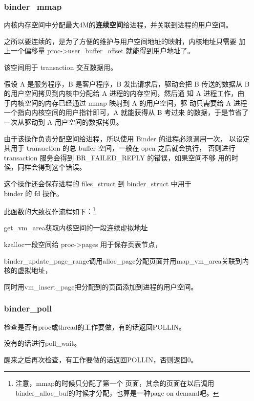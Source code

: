 \documentclass[a4paper,11pt]{article}
\begin{document}
\subsubsection{binder_mmap}\label{Bindermmap}
内核内存空间中分配最大4M的\textbf{\color{red}连续空间}给进程，并关联到进程的用户空间。
\begin{itemize*}
    \item 之所以要连续的，是为了方便的维护与用户空间地址的映射，内核地址只需要
        加上一个偏移量 proc->user_buffer_offset 就能得到用户地址了。
    \item 该空间用于 transaction 交互数据用。

        {\footnotesize 假设 A 是服务程序，B 是客户程序，B 发出请求后，驱动会把
        B 传送的数据从 B 的用户空间拷贝到内核中分配给 A 进程的内存空间，然后通
        知 A 进程工作，由于内核空间的内存已经通过 mmap 映射到 A 的用户空间，驱
        动只需要给 A 进程一个指向内核空间的用户指针即可，A 就能获得从 B 考过来
        的数据，于是节省了一次从驱动到 A 用户空间的数据拷贝。}
    \item 由于该操作负责分配空间给进程，所以使用 Binder 的进程必须调用一次，
        以设定其用于 transaction 的总 buffer 空间，一般在 open 之后就会执行，
        否则进行 transaction 服务会得到 BR_FAILED_REPLY 的错误，如果空间不够
        用的时候，同样会得到这个错误。
    \item 这个操作还会保存进程的 files_struct 到 binder_struct 中用于\\ binder
        的 fd 操作。
\end{itemize*}
此函数的大致操作流程如下：\footnote{\color{blue}注意，mmap的时候只分配了第一个
页面，其余的页面在以后调用binder_alloc_buf的时候才分配，也算是一种page on
demand吧。}
\begin{itemize*}
    \item get_vm_area获取内核空间的一段连续虚拟地址
    \item kzalloc一段空间给 proc->pages 用于保存页表节点，
    \item binder_update_page_range调用alloc_page分配页面并用map_vm_area关联到内核的虚拟地址，
    \item 同时用vm_insert_page把分配到的页面添加到进程的用户空间。
\end{itemize*}

\subsubsection{binder_poll}
\begin{itemize*}
    \item 检查是否有proc或thread的工作要做，有的话返回POLLIN。
    \item 没有的话进行poll_wait。
    \item 醒来之后再次检查，有工作要做的话返回POLLIN，否则返回0。
\end{itemize*}
\end{document}
